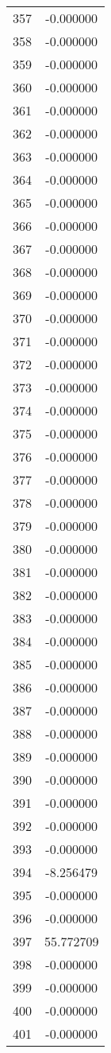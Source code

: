 \documentclass[12pt]{article}
\begin{document}
\begin{longtable}{@{}cc@{}}
357 & -0.000000 \\
358 & -0.000000 \\
359 & -0.000000 \\
360 & -0.000000 \\
361 & -0.000000 \\
362 & -0.000000 \\
363 & -0.000000 \\
364 & -0.000000 \\
365 & -0.000000 \\
366 & -0.000000 \\
367 & -0.000000 \\
368 & -0.000000 \\
369 & -0.000000 \\
370 & -0.000000 \\
371 & -0.000000 \\
372 & -0.000000 \\
373 & -0.000000 \\
374 & -0.000000 \\
375 & -0.000000 \\
376 & -0.000000 \\
377 & -0.000000 \\
378 & -0.000000 \\
379 & -0.000000 \\
380 & -0.000000 \\
381 & -0.000000 \\
382 & -0.000000 \\
383 & -0.000000 \\
384 & -0.000000 \\
385 & -0.000000 \\
386 & -0.000000 \\
387 & -0.000000 \\
388 & -0.000000 \\
389 & -0.000000 \\
390 & -0.000000 \\
391 & -0.000000 \\
392 & -0.000000 \\
393 & -0.000000 \\
394 & -8.256479 \\
395 & -0.000000 \\
396 & -0.000000 \\
397 & 55.772709 \\
398 & -0.000000 \\
399 & -0.000000 \\
400 & -0.000000 \\
401 & -0.000000 \\

\end{longtable}
\end{document}
